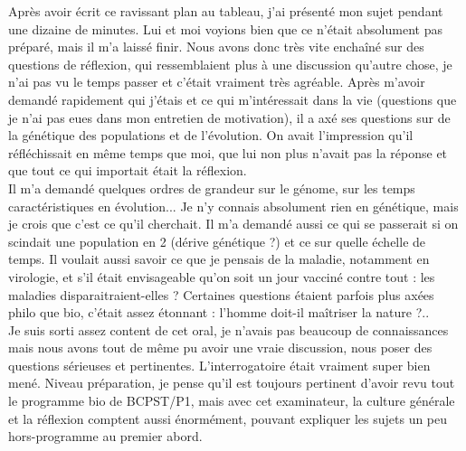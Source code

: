 \vspace{.25cm}

Après avoir écrit ce ravissant plan au tableau, j'ai présenté mon sujet pendant une dizaine de minutes. Lui et moi voyions bien que ce n'était absolument pas préparé, mais il m'a laissé finir. Nous avons donc très vite enchaîné sur des questions de réflexion, qui ressemblaient plus à une discussion qu'autre chose, je n'ai pas vu le temps passer et c'était vraiment très agréable. Après m'avoir demandé rapidement qui j'étais et ce qui m'intéressait dans la vie (questions que je n'ai pas eues dans mon entretien de motivation), il a axé ses questions sur de la génétique des populations et de l'évolution. On avait l'impression qu'il réfléchissait en même temps que moi, que lui non plus n'avait pas la réponse et que tout ce qui importait était la réflexion. \\

Il m'a demandé quelques ordres de grandeur sur le génome, sur les temps caractéristiques en évolution... Je n'y connais absolument rien en génétique, mais je crois que c'est ce qu'il cherchait. Il m'a demandé aussi ce qui se passerait si on scindait une population en 2 (dérive génétique ?) et ce sur quelle échelle de temps. Il voulait aussi savoir ce que je pensais de la maladie, notamment en virologie, et s'il était envisageable qu'on soit un jour vacciné contre tout : les maladies disparaitraient-elles ? Certaines questions étaient parfois plus axées philo que bio, c'était assez étonnant : l'homme doit-il maîtriser la nature ?..\\

Je suis sorti assez content de cet oral, je n'avais pas beaucoup de connaissances mais nous avons tout de même pu avoir une vraie discussion, nous poser des questions sérieuses et pertinentes. L'interrogatoire était vraiment super bien mené. Niveau préparation, je pense qu'il est toujours pertinent d'avoir revu tout le programme bio de BCPST/P1, mais avec cet examinateur, la culture générale et la réflexion comptent aussi énormément, pouvant expliquer les sujets un peu hors-programme au premier abord. \\

